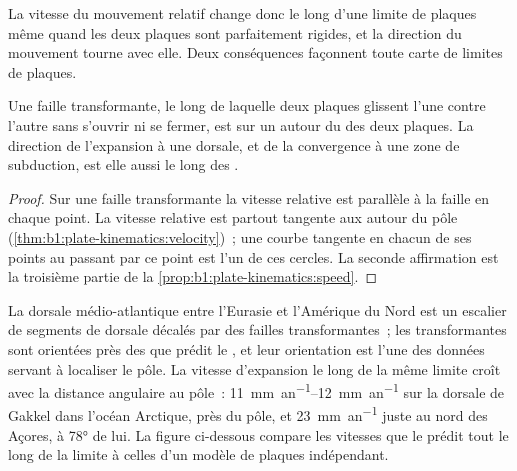 La vitesse du mouvement relatif change donc le long d'une limite de plaques
même quand les deux plaques sont parfaitement rigides, et la direction du mouvement tourne
avec elle. Deux conséquences façonnent toute carte de limites de plaques.

\begin{proposition}\label{prop:b1:plate-kinematics:transforms}
Une faille transformante, le long de laquelle deux plaques glissent l'une contre l'autre sans
s'ouvrir ni se fermer, est sur un  autour du  des deux
plaques. La direction de l'expansion à une dorsale, et de la convergence à une
zone de subduction, est elle aussi le long des .
\end{proposition}

\begin{proof}
Sur une faille transformante la vitesse relative est parallèle à la faille en chaque
point. La vitesse relative est partout tangente aux  autour du
pôle (\cref{thm:b1:plate-kinematics:velocity})~; une courbe tangente en chacun de
ses points au  passant par ce point est l'un de ces cercles. La
seconde affirmation est la troisième partie de la \cref{prop:b1:plate-kinematics:speed}.
\end{proof}

La dorsale médio-atlantique entre l'Eurasie et l'Amérique du Nord est un escalier de
segments de dorsale décalés par des failles transformantes~; les transformantes sont orientées près des
 que prédit le , et leur orientation est l'une des données servant à
localiser le pôle. La vitesse d'expansion le long de la même limite croît avec la
distance angulaire au pôle~: \qtyrange{11}{12}{mm.an^{-1}} sur la dorsale de Gakkel
dans l'océan Arctique, près du pôle, et \qty{23}{mm.an^{-1}} juste au nord
des Açores, à \ang{78} de lui. La figure ci-dessous compare les vitesses que le  prédit tout le long de la limite à celles d'un modèle de plaques indépendant.

